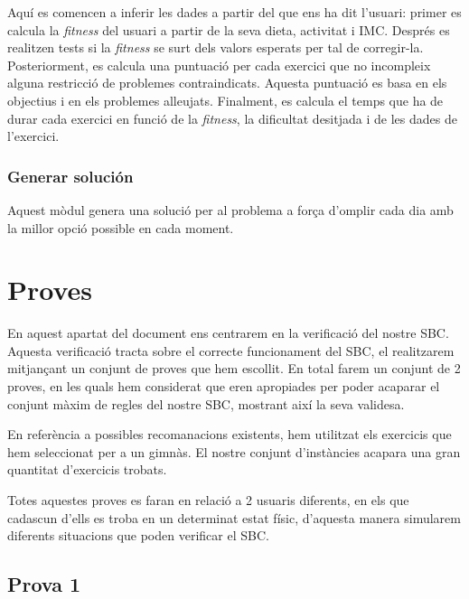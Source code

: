 \documentclass[a4paper, 12pt, UTF8]{article}
\begin{document}
Aquí es comencen a inferir les dades a partir del que ens ha dit l'usuari: primer es calcula la \textit{fitness} del usuari a partir de la seva dieta, activitat i IMC. Després es realitzen tests si la \textit{fitness} se surt dels valors esperats per tal de corregir-la.
Posteriorment, es calcula una puntuació per cada exercici que no incompleix alguna restricció de problemes contraindicats. Aquesta puntuació es basa en els objectius i en els problemes alleujats. Finalment, es calcula el temps que ha de durar cada exercici en funció de la \textit{fitness}, la dificultat desitjada i de les dades de l'exercici.

\subsubsection{Generar solución}
Aquest mòdul genera una solució per al problema a força d'omplir cada dia amb la millor opció possible en cada moment.


\section{Proves}

En aquest apartat del document ens centrarem en la verificació del nostre SBC. Aquesta verificació tracta sobre el correcte funcionament del SBC, el realitzarem mitjançant un conjunt de proves que hem escollit. En total farem un conjunt de 2 proves, en les quals hem considerat que eren apropiades per poder acaparar el conjunt màxim de regles del nostre SBC, mostrant així la seva validesa.

En referència a possibles recomanacions existents, hem utilitzat els exercicis que hem seleccionat per a un gimnàs. El nostre conjunt d'instàncies acapara una gran quantitat d'exercicis trobats. 

Totes aquestes proves es faran en relació a 2 usuaris diferents, en els que cadascun d'ells es troba en un determinat estat físic, d'aquesta manera simularem diferents situacions que poden verificar el SBC.

\subsection{Prova 1}
\end{document}
